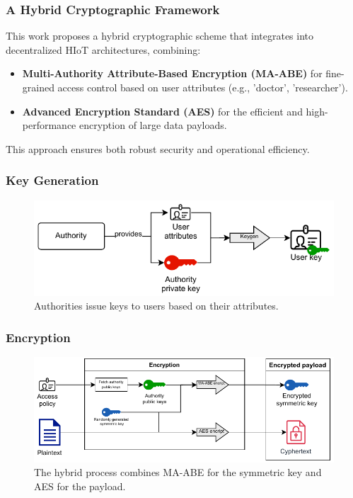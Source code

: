 \documentclass{beamer}
\begin{document}
\begin{frame}
    \frametitle{A Hybrid Cryptographic Framework}
    This work proposes a hybrid cryptographic scheme that integrates into decentralized HIoT architectures, combining:
    \begin{itemize}
        \item \textbf{Multi-Authority Attribute-Based Encryption (MA-ABE)} for fine-grained access control based on user attributes (e.g., 'doctor', 'researcher').
        \item \textbf{Advanced Encryption Standard (AES)} for the efficient and high-performance encryption of large data payloads.
    \end{itemize}
    This approach ensures both robust security and operational efficiency.
\end{frame}

\begin{frame}
    \frametitle{Key Generation}
    \begin{figure}
    \includegraphics[width=\textwidth]{images/diagrams/keygen_diagram.pdf}
    \caption{Authorities issue keys to users based on their attributes.}
\end{figure}

\end{frame}
    \begin{frame}
    \frametitle{Encryption}
    \begin{figure}
        \includegraphics[width=\textwidth]{images/diagrams/encryption_diagram.pdf}
        \caption{The hybrid process combines MA-ABE for the symmetric key and AES for the payload.}
    \end{figure}
\end{frame}
        
\end{document}

